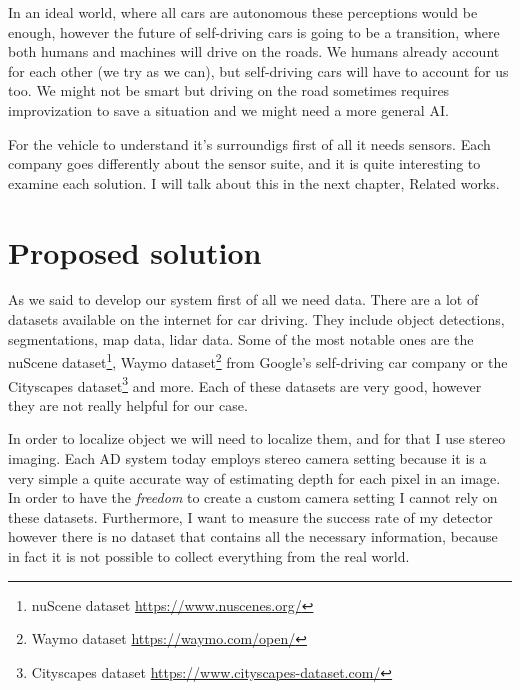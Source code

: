In an ideal world, where all cars are autonomous these perceptions would be
enough, however the future of self-driving cars is going to be a transition,
where both humans and machines will drive on the roads. We humans already
account for each other (we try as we can), but self-driving cars will have to
account for us too. We might not be smart but driving on the road sometimes
requires improvization to save a situation and we might need a more general AI.

For the vehicle to understand it's surroundigs first of all it needs sensors.
Each company goes differently about the sensor suite, and it is quite
interesting to examine each solution. I will talk about this in the next
chapter, Related works.

\section{Proposed solution}

As we said to develop our system first of all we need data. There are a lot of
datasets available on the internet for car driving. They include object
detections, segmentations, map data, lidar data. Some of the most notable ones
are the nuScene dataset\footnote{nuScene dataset
    \url{https://www.nuscenes.org/}}, Waymo dataset\footnote{Waymo dataset
    \url{https://waymo.com/open/}} from Google's self-driving car company or the
Cityscapes dataset\footnote{Cityscapes dataset
    \url{https://www.cityscapes-dataset.com/}} and more. Each of these datasets are
very good, however they are not really helpful for our case.

In order to localize object we will need to localize them, and for that I use
stereo imaging. Each AD system today employs stereo camera setting because it is
a very simple a quite accurate way of estimating depth for each pixel in an
image. In order to have the \emph{freedom} to create a custom camera setting I
cannot rely on these datasets. Furthermore, I want to measure the success rate of
my detector however there is no dataset that contains all the necessary
information, because in fact it is not possible to collect everything from the
real world.

